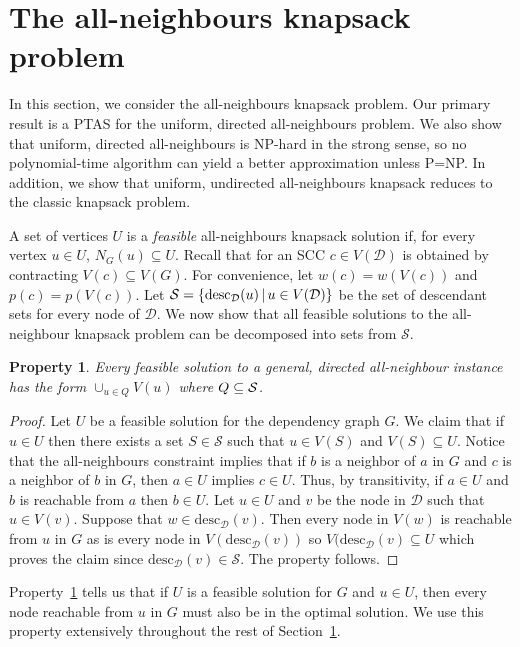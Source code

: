 \documentclass[12pt]{article}
\newtheorem{property}[theorem]{Property}
\newcommand{\desc}{\ensuremath{\mathrm{desc}}}
\begin{document}
\section{The all-neighbours knapsack problem} \label{sec:all-neighbours}

In this section, we consider the all-neighbours knapsack problem.  Our
primary result is a PTAS for the uniform, directed all-neighbours
problem.  We also show that uniform, directed all-neighbours is
NP-hard in the strong sense, so no polynomial-time algorithm can yield
a better approximation unless P=NP.  In addition, we show that
uniform, undirected all-neighbours knapsack reduces to the classic
knapsack
problem.

A set of vertices $U$ is a {\em feasible} all-neighbours knapsack
solution if, for every vertex $u \in U$, $N_G(u) \subseteq U$.  Recall
that for an SCC $c \in V(\mathcal{D})$ is obtained by contracting
$V(c) \subseteq V(G)$.  For convenience, let $w(c) = w(V(c))$ and
$p(c) = p(V(c))$.  Let $\mathcal{S}=\{ \desc_\mathcal{D}(u) \,|\, u
\in V(\cal{D})\}$ be the set of descendant sets for every node of
$\mathcal{D}$.  We now show that all feasible solutions to the
all-neighbour knapsack problem can be decomposed into sets from
$\mathcal{S}$.

\begin{property} \label{prop:all-neighbours}
Every feasible solution to a general, directed all-neighbour instance has the form $\cup_{u \in Q} V(u)$ where $Q \subseteq \cal{S}$.
\end{property}

\begin{proof}
Let $U$ be a feasible solution for the dependency graph $G$.  We claim
that if $u \in U$ then there exists a set $S \in \mathcal{S}$ such
that $u \in V(S)$ and $V(S) \subseteq U$.  Notice that the
all-neighbours constraint implies that if $b$ is a neighbor of $a$ in
$G$ and $c$ is a neighbor of $b$ in $G$, then $a \in U$ implies $c \in
U$.  Thus, by transitivity, if $a \in U$ and $b$ is reachable from $a$
then $b \in U$.  Let $u \in U$ and $v$ be the node in $\mathcal{D}$
such that $u \in V(v)$.  Suppose that $w \in \desc_{\mathcal{D}}(v)$.
Then every node in $V(w)$ is reachable from $u$ in $G$ as is every
node in $V(\desc_{\mathcal{D}}(v))$ so $V(\desc_{\mathcal{D}}(v)
\subseteq U$ which proves the claim since $\desc_\mathcal{D}(v) \in
\mathcal{S}$.  The property follows.
\end{proof}

Property~\ref{prop:all-neighbours} tells us that if $U$ is a feasible solution for $G$ and $u \in U$, then every node reachable from $u$ in $G$ must also be in the optimal solution.  We use this property extensively throughout the rest of Section~\ref{sec:all-neighbours}.
\end{document}
